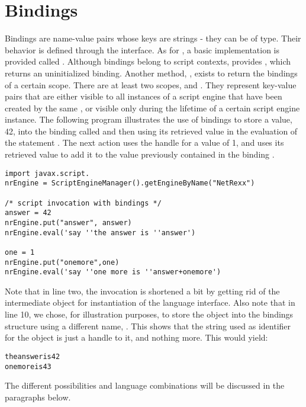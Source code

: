 \section{Bindings}
Bindings are name-value pairs whose keys are strings - they can be of \Rexx{} type. Their behavior is defined through the  interface. As for , a basic implementation is provided called . Although bindings belong to script contexts,  provides , which returns an uninitialized binding. Another method, , exists to return the bindings of a certain scope. There are at least two scopes,  and . They represent key-value pairs that are either visible to all instances of a script engine that have been created by the same , or visible only during the lifetime of a certain script engine instance. The following program illustrates the use of bindings to store a value, 42, into the binding called  and then using its retrieved value in the evaluation of the statement . The next action uses the handle  for a value of 1, and uses its retrieved value to add it to the value previously contained in the binding .
\begin{lstlisting}[label=bindingsjsr223,caption=Object Bindings]
import javax.script.
nrEngine = ScriptEngineManager().getEngineByName("NetRexx")

/* script invocation with bindings */
answer = 42
nrEngine.put("answer", answer)
nrEngine.eval('say ''the answer is ''answer')

one = 1
nrEngine.put("onemore",one)
nrEngine.eval('say ''one more is ''answer+onemore')
\end{lstlisting}
Note that in line two, the invocation is shortened a bit by getting rid of the intermediate  object for instantiation of the language interface. Also note that in line 10, we chose, for illustration purposes, to store the  object into the bindings structure using a different name, . This shows that the string used as identifier for the object is just a handle to it, and nothing more.
This would yield:
\begin{alltt}
the answer is 42
one more is 43
\end{alltt}
The different possibilities and language combinations will be discussed in the paragraphs below.
 
